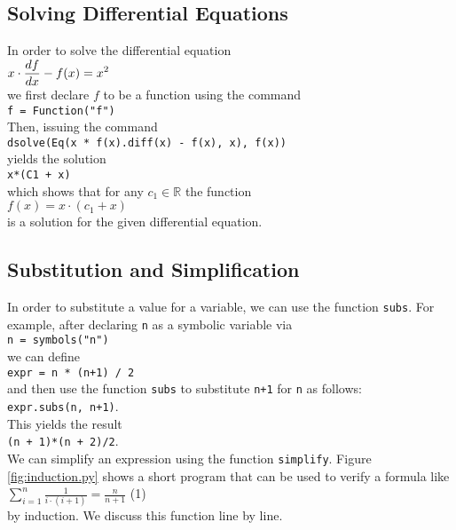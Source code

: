 \documentclass{article}
\begin{document}
\subsection{Solving Differential Equations}
In order to solve the differential equation
\\[0.2cm]
\hspace*{1.3cm}
$\displaystyle x \cdot \frac{d\hspace{0.1pt}f}{dx} - f(x) = x^2$
\\[0.2cm]
we first declare $f$ to be a function using the command 
\\[0.2cm]
\hspace*{1.3cm}
\texttt{f = Function("f")}
\\[0.2cm]
Then, issuing the command
\\[0.2cm]
\hspace*{1.3cm}
\texttt{dsolve(Eq(x * f(x).diff(x) - f(x), x), f(x))}
\\[0.2cm]
yields the solution
\\[0.2cm]
\hspace*{1.3cm}
\texttt{x*(C1 + x)}
\\[0.2cm]
which shows that for any $c_1 \in \mathbb{R}$ the function
\\[0.2cm]
\hspace*{1.3cm}
$f(x) = x \cdot (c_{1} + x)$
\\[0.2cm]
is a solution for the given differential equation.

\subsection{Substitution and Simplification}
In order to substitute a value for a variable, we can use the function \texttt{subs}.  For
example, after declaring \texttt{n} as a symbolic variable via
\\[0.2cm]
\hspace*{1.3cm}
\texttt{n = symbols("n")}
\\[0.2cm]
we can define
\\[0.2cm]
\hspace*{1.3cm}
\texttt{expr = n * (n+1) / 2}
\\[0.2cm]
and then use the function \texttt{subs} to substitute \texttt{n+1} for \texttt{n} as follows:
\\[0.2cm]
\hspace*{1.3cm}
\texttt{expr.subs(n, n+1)}.
\\[0.2cm]
This yields the result
\\[0.2cm]
\hspace*{1.3cm}
\texttt{(n + 1)*(n + 2)/2}.
\\[0.2cm]
We can simplify an expression using the function \texttt{simplify}.
Figure \ref{fig:induction.py} shows a short program that can be used to verify a formula like
\\[0.2cm]
\hspace*{1.3cm}
$\displaystyle  \sum\limits_{i=1}^n \frac{1}{i \cdot (i+1)} = \frac{n}{n+1}$ \hspace*{\fill} (1)
\\[0.2cm]
by induction.  We discuss this function line by line.
\end{document}
